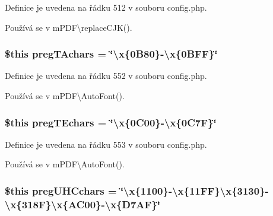 Definice je uvedena na řádku 512 v souboru config.\-php.



Používá se v m\-P\-D\-F\textbackslash{}replace\-C\-J\-K().

\hypertarget{config_8php_aebe9e5d87e50adfe03eaf2b5c938ba7f}{
\subsubsection[{preg\-T\-Achars}]{\setlength{\rightskip}{0pt plus 5cm}\$this preg\-T\-Achars = \char`\"{}\textbackslash{}x\{0\-B80\}-\/\textbackslash{}x\{0\-B\-F\-F\}\char`\"{}}}\label{config_8php_aebe9e5d87e50adfe03eaf2b5c938ba7f}


Definice je uvedena na řádku 552 v souboru config.\-php.



Používá se v m\-P\-D\-F\textbackslash{}\-Auto\-Font().

\hypertarget{config_8php_ac9ea40a17f92c27a2ac82e45d2d64844}{
\subsubsection[{preg\-T\-Echars}]{\setlength{\rightskip}{0pt plus 5cm}\$this preg\-T\-Echars = \char`\"{}\textbackslash{}x\{0\-C00\}-\/\textbackslash{}x\{0\-C7\-F\}\char`\"{}}}\label{config_8php_ac9ea40a17f92c27a2ac82e45d2d64844}


Definice je uvedena na řádku 553 v souboru config.\-php.



Používá se v m\-P\-D\-F\textbackslash{}\-Auto\-Font().

\hypertarget{config_8php_a46d874f5173309d8e5cbaa06fd229f52}{
\subsubsection[{preg\-U\-H\-Cchars}]{\setlength{\rightskip}{0pt plus 5cm}\$this preg\-U\-H\-Cchars = \char`\"{}\textbackslash{}x\{1100\}-\/\textbackslash{}x\{11\-F\-F\}\textbackslash{}x\{3130\}-\/\textbackslash{}x\{318\-F\}\textbackslash{}x\{\-A\-C00\}-\/\textbackslash{}x\{\-D7\-A\-F\}\char`\"{}}}\label{config_8php_a46d874f5173309d8e5cbaa06fd229f52}


